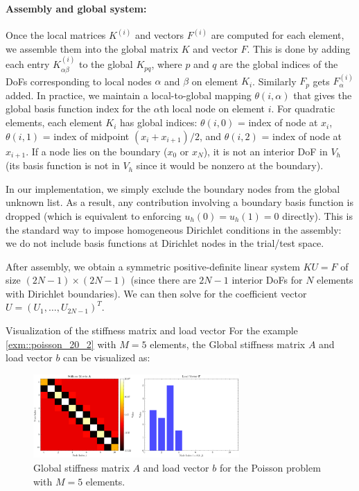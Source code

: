 \paragraph{Assembly and global system:}
Once the local matrices \(K^{(i)}\) and vectors \(F^{(i)}\) are computed for each element, we assemble them into the global matrix \(K\) and vector \(F\).
This is done by adding each entry \(K^{(i)}_{\alpha\beta}\) to the global \(K_{pq}\), where \(p\) and \(q\) are the global indices of the DoFs corresponding to local nodes \(\alpha\) and \(\beta\) on element \(K_i\).
Similarly \(F_p\) gets \(F^{(i)}_\alpha\) added. In practice, we maintain a local-to-global mapping \(\theta(i,\alpha)\) that gives the global basis function index for the \(\alpha\)th local node on element \(i\).
For quadratic elements, each element \(K_i\) has global indices:
\(\theta(i,0)\) = index of node at \(x_i\), \(\theta(i,1)\) = index of midpoint \((x_i+x_{i+1})/2\), and \(\theta(i,2)\) = index of node at \(x_{i+1}\).
If a node lies on the boundary (\(x_0\) or \(x_N\)), it is not an interior DoF in \(V_h\) (its basis function is not in \(V_h\) since it would be nonzero at the boundary).

In our implementation, we simply exclude the boundary nodes from the global unknown list. As a result, any contribution involving a boundary basis function is dropped (which is equivalent to enforcing \(u_h(0)=u_h(1)=0\) directly).
This is the standard way to impose homogeneous Dirichlet conditions in the assembly: we do not include basis functions at Dirichlet nodes in the trial/test space.

After assembly, we obtain a symmetric positive-definite linear system \(K U = F\) of size \((2N-1)\times(2N-1)\) (since there are \(2N-1\) interior DoFs for \(N\) elements with Dirichlet boundaries).
We can then solve for the coefficient vector \(U = (U_1,\dots,U_{2N-1})^T\).

\begin{remark}{Visualization of the stiffness matrix and load vector}{}
	For the example \ref{exm::poisson_20_2} with \(M=5\) elements, the Global stiffness matrix \(A\) and load vector \(b\) can be visualized as:
	\begin{figure}[H]
		\centering
		\includegraphics[width=0.7\textwidth]{figures/stiffness_matrix_and_load_vector_5_test.png}
		\caption{Global stiffness matrix \(A\) and load vector \(b\) for the Poisson problem with \(M=5\) elements.}
	\end{figure}
\end{remark}

